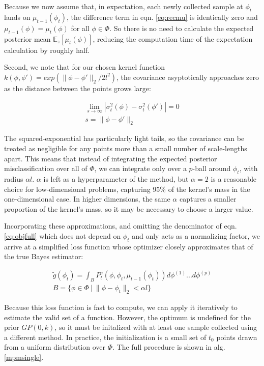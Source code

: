 \documentclass[12pt, conference]{IEEEtran}
\begin{document}
Because we now assume that, in expectation, each newly collected sample at $\phi_t$ lands on $\mu_{t-1}(\phi_t)$, the difference term in eqn. \ref{eq:recmu} is identically zero and $\mu_{t-1}(\phi)=\mu_t(\phi)$ for all $\phi\in\Phi$. So there is no need to calculate the expected posterior mean $\mathbb{E}_z[\mu_t(\phi)]$, reducing the computation time of the expectation calculation by roughly half.

Second, we note that for our chosen kernel function $k(\phi,\phi')=exp(\|\phi-\phi'\|_2/2l^2)$, the covariance asyptotically approaches zero as the distance between the points grows large:

\begin{align}
    \lim_{s\rightarrow\infty} |\sigma_t^2(\phi)-\sigma_t^2(\phi')|=0 \\
    s = \|\phi-\phi'\|_2 \nonumber
\end{align}

The squared-exponential has particularly light tails, so the covariance can be treated as negligible for any points more than a small number of scale-lengths apart. This means that instead of integrating the expected posterior misclassification over all of $\Phi$, we can integrate only over a $p$-ball around $\phi_t$, with radius $\alpha l$. $\alpha$ is left as a hyperparameter of the method, but $\alpha=2$ is a reasonable choice for low-dimensional problems, capturing 95\% of the kernel's mass in the one-dimensional case. In higher dimensions, the same $\alpha$ captures a smaller proportion of the kernel's mass, so it may be necessary to choose a larger value.

Incorporating these approximations, and omitting the denominator of eqn. \ref{eq:objfull} which does not depend on $\phi_t$ and only acts as a normalizing factor, we arrive at a simplified loss function whose optimizer closely approximates that of the true Bayes estimator:

\begin{align}
    \label{eq:objapprox}
    \tilde{g}(\phi_t)=\int_B P_t^e(\phi,\phi_t,\mu_{t-1}(\phi_t))d\phi^{(1)}...d\phi^{(p)} \\
    B = \{\phi\in\Phi\ |\ \|\phi-\phi_t\|_2<\alpha l\} \nonumber
\end{align}

Because this loss function is fast to compute, we can apply it iteratively to estimate the valid set of a function. However, the optimum is undefined for the prior $GP(0,k)$, so it must be initalized with at least one sample collected using a different method. In practice, the initialization is a small set of $t_0$ points drawn from a uniform distribution over $\Phi$. The full procedure is shown in alg. \ref{mpmsingle}.
\end{document}
